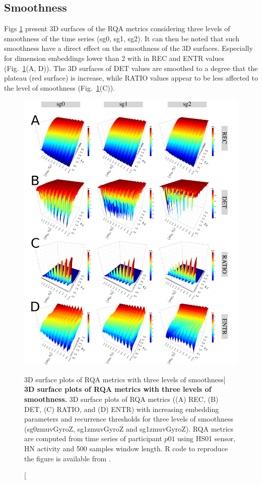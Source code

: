 \subsection{Smoothness}
Figs \ref{fig:topo_smoothness} present 3D surfaces of the RQA metrics
considering three levels of smoothness of the time series (sg0, sg1, sg2).
It can then be noted that such smoothness have a direct effect on the 
smoothness of the 3D surfaces.
Especially for dimension embeddings lower than 2 with in REC and ENTR values 
(Fig.~\ref{fig:topo_smoothness}(A, D)).
The 3D surfaces of DET values are smoothed to a degree that the plateau 
(red surface) is increase, while RATIO values appear to be less 
affected to the level of smoothness (Fig.~\ref{fig:topo_smoothness}(C)).
\begin{figure}
\centering
\includegraphics[width=1.0\textwidth]{fig_6_13}
    \caption
	[3D surface plots of RQA metrics with three levels of smoothness]{
	{\bf 3D surface plots of RQA metrics with three levels of smoothness.}
	3D surface plots of RQA metrics ((A) REC, (B) DET, (C) RATIO, and (D) ENTR) 
	with increasing embedding parameters and recurrence thresholds for 
	three levels of smoothness 
	(sg0zmuvGyroZ, sg1zmuvGyroZ and sg1zmuvGyroZ).
	RQA metrics are computed from time series of participant $p01$ using 
	HS01 sensor, HN activity and 500 samples window length.
	R code to reproduce the figure is available from \cite{hwum2018}.
 }
\label{fig:topo_smoothness}
\end{figure}

